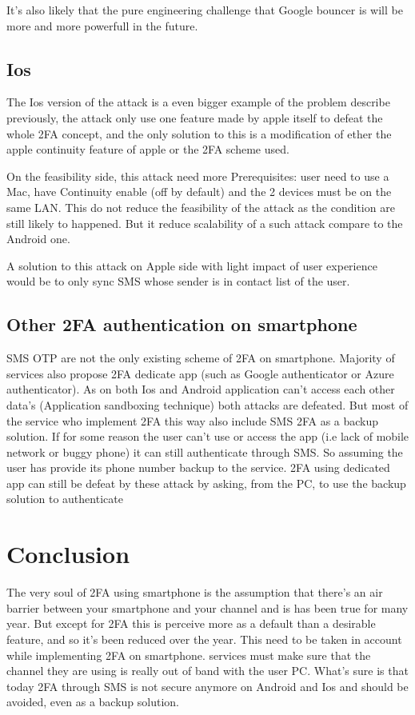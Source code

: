 \documentclass[11pt, a4paper,twocolumn]{article}
\begin{document}
It's also likely that the pure engineering challenge that Google bouncer is will be more and more powerfull in the future. 

\subsection{Ios}
The Ios version of the attack is a even bigger example of the problem describe previously, the attack only use one feature made by apple itself to defeat the whole 2FA concept, and the only solution to this is a modification of ether the apple continuity feature of apple or the 2FA scheme used. 

On the feasibility side, this attack need more Prerequisites: user need to use a Mac, have Continuity enable (off by default) and the 2 devices must be on the same LAN. This do not reduce the feasibility of the attack as the condition are still likely to happened. But it reduce scalability of a such attack compare to the Android one.

A solution to this attack on Apple side with light impact of user experience would be to only sync SMS whose sender is in contact list of the user.

\subsection{Other 2FA authentication on smartphone}
SMS OTP are not the only existing scheme of 2FA on smartphone. Majority of services also propose 2FA dedicate app (such as Google authenticator or Azure authenticator). As on both Ios and Android application can't access each other data's (Application sandboxing technique) both attacks are defeated. But most of the service who implement 2FA this way also include SMS 2FA as a backup solution. If for some reason the user can't use or access the app (i.e lack of mobile network or buggy phone) it can still authenticate through SMS. So assuming the user has provide its phone number backup to the service. 2FA using dedicated app can still be defeat by these attack by asking, from the PC, to use the backup solution to authenticate


\section{Conclusion}

The very soul of 2FA using smartphone is the assumption that there's an air barrier between your smartphone and your channel and is has been true for many year. But except for 2FA this is perceive more as a default than a desirable feature, and so it's been reduced over the year. This need to be taken in account while implementing 2FA on smartphone. services must make sure that the channel they are using is really out of band with the user PC. What's sure is that today 2FA through SMS is not secure anymore on Android and Ios and should be avoided, even as a backup solution.

\clearpage
 

\end{document}
